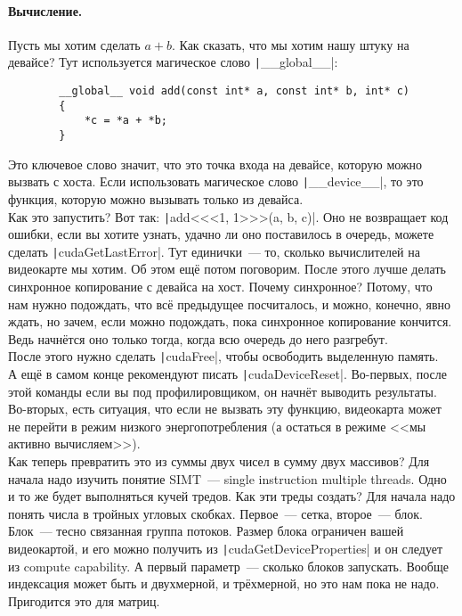 \documentclass{article}
\begin{document}
    \paragraph{Вычисление.}
    Пусть мы хотим сделать $a+b$. Как сказать, что мы хотим нашу штуку на девайсе? Тут используется магическое слово \texttt|__global__|:
    \begin{verbatim}
        __global__ void add(const int* a, const int* b, int* c)
        {
            *c = *a + *b;
        }
    \end{verbatim}
    Это ключевое слово значит, что это точка входа на девайсе, которую можно вызвать с хоста. Если использовать магическое слово \texttt|__device__|, то это функция, которую можно вызывать только из девайса.\\
    Как это запустить? Вот так: \texttt|add<<<1, 1>>>(a, b, c)|. Оно не возвращает код ошибки, если вы хотите узнать, удачно ли оно поставилось в очередь, можете сделать \texttt|cudaGetLastError|. Тут единички~--- то, сколько вычислителей на видеокарте мы хотим. Об этом ещё потом поговорим. После этого лучше делать синхронное копирование с девайса на хост. Почему синхронное? Потому, что нам нужно подождать, что всё предыдущее посчиталось, и можно, конечно, явно ждать, но зачем, если можно подождать, пока синхронное копирование кончится. Ведь начнётся оно только тогда, когда всю очередь до него разгребут.\\
    После этого нужно сделать \texttt|cudaFree|, чтобы освободить выделенную память.\\
    А ещё в самом конце рекомендуют писать \texttt|cudaDeviceReset|. Во-первых, после этой команды если вы под профилировщиком, он начнёт выводить результаты. Во-вторых, есть ситуация, что если не вызвать эту функцию, видеокарта может не перейти в режим низкого энергопотребления (а остаться в режиме <<мы активно вычисляем>>).\\
    Как теперь превратить это из суммы двух чисел в сумму двух массивов? Для начала надо изучить понятие SIMT~--- single instruction multiple threads. Одно и то же будет выполняться кучей тредов. Как эти треды создать? Для начала надо понять числа в тройных угловых скобках. Первое~--- сетка, второе~--- блок. Блок~--- тесно связанная группа потоков. Размер блока ограничен вашей видеокартой, и его можно получить из \texttt|cudaGetDeviceProperties| и он следует из compute capability. А первый параметр~--- сколько блоков запускать. Вообще индексация может быть и двухмерной, и трёхмерной, но это нам пока не надо. Пригодится это для матриц.\\
\end{document}
